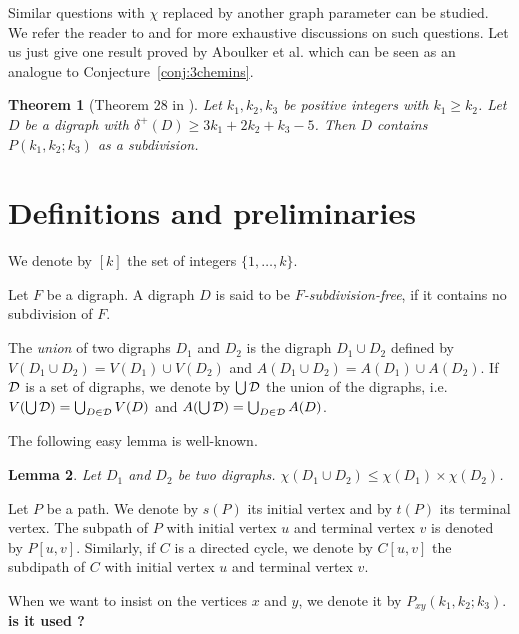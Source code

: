 \documentclass[utf8,10pt]{article}
\theoremstyle{plain}
\newtheorem{theorem}{Theorem}
\newtheorem{lemma}[theorem]{Lemma}
\theoremstyle{definition}
\theoremstyle{remark}
\begin{document}
Similar questions with $\chi$ replaced by another graph parameter can be studied.
We refer the reader to \cite{AC+16} and \cite{CHLN16} for more exhaustive discussions on such questions.
Let us just give one result proved by Aboulker et al. \cite{AC+16} which can be seen as an analogue to Conjecture~\ref{conj:3chemins}.

\begin{theorem}[Theorem 28 in \cite{AC+16}]
Let $k_1,k_2,k_3$ be  positive integers with $k_1 \ge k_2$.
Let $D$ be a digraph with $\delta^+(D) \geq 3k_1+2k_2+k_3-5$. Then $D$ contains $P(k_1,k_2;k_3)$ as a subdivision.
\end{theorem}


\section{Definitions and preliminaries}


We denote by $[k]$ the set of integers $\{1, \dots , k\}$.

Let $F$ be a digraph.
A digraph $D$ is said to be {\it $F$-subdivision-free}, if it contains no subdivision of $F$.

The {\it union} of two digraphs $D_1$ and $D_2$ is the digraph  $D_1\cup D_2$ defined by $V(D_1\cup D_2) = V(D_1)\cup V(D_2)$ and 
$A(D_1\cup D_2) = A(D_1)\cup A(D_2)$.
If ${\cal D}$ is a set of digraphs, we denote by $\bigcup {\cal D}$ the union of the digraphs, i.e. $V(\bigcup {\cal D}) =\bigcup_{D\in {\cal D}} V(D)$
and $A(\bigcup {\cal D}) =\bigcup_{D\in {\cal D}} A(D)$.


The following easy lemma is well-known.

\begin{lemma}\label{lem:decomp}
Let $D_1$ and $D_2$ be two digraphs.
$\chi(D_1\cup D_2) \leq \chi(D_1)\times \chi(D_2)$.
\end{lemma}




Let $P$ be a path. We denote by $s(P)$ its initial vertex and by $t(P)$ its terminal vertex.
The subpath of $P$ with initial vertex $u$ and terminal vertex $v$ is denoted by $P[u,v]$.
Similarly, if $C$ is a directed cycle, we denote by $C[u,v]$ the subdipath of $C$ with initial vertex $u$ and terminal vertex $v$.


When we want to insist on the vertices $x$ and $y$, we denote it by $P_{xy}(k_1,k_2;k_3)$.
{\bf is it used ?}
\end{document}

